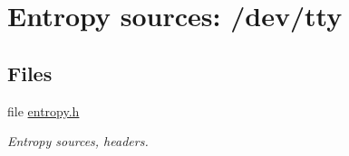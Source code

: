 \hypertarget{group__ES__tty__m}{
\section{Entropy sources: /dev/tty}
\label{group__ES__tty__m}
}
\subsection*{Files}
\begin{CompactItemize}
\item 
file \hyperlink{entropy_8h}{entropy.h}
\begin{CompactList}\small\item\em Entropy sources, headers. \item\end{CompactList}

\end{CompactItemize}
